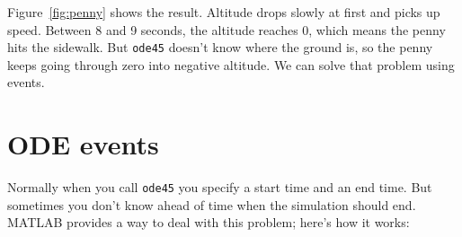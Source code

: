 \documentclass[
]{book}
\numberwithin{Answer}{chapter}
\numberwithin{Exercise}{chapter}
\begin{document}
Figure~\ref{fig:penny} shows the result.  Altitude drops slowly at first and picks up speed.  Between 8 and 9 seconds, the altitude reaches 0, which means the penny hits the sidewalk.  But {\tt ode45} doesn't know where the ground is, so the penny keeps going through zero into negative altitude.  We can solve that problem using events.


\section{ODE events}
\label{sect:events}


Normally when you call {\tt ode45} you specify a start time and
an end time.  But sometimes you don't know ahead of time when the
simulation should end.  MATLAB provides a way to deal with this problem; here's how it works:

\end{document}
